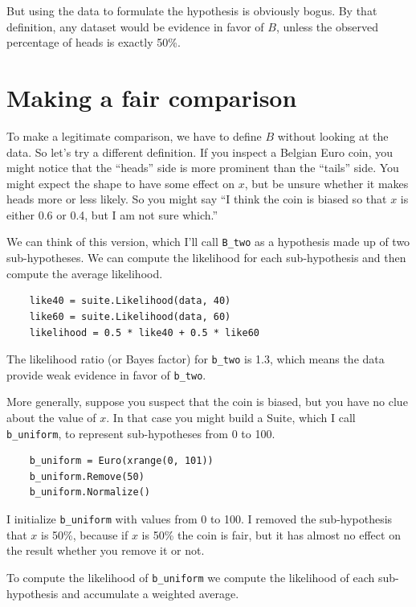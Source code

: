 \documentclass[12pt]{book}
\begin{document}
But using the data to formulate the hypothesis
is obviously bogus.  By that definition, any dataset would
be evidence in favor of $B$, unless the observed percentage of heads
is exactly 50\%.

\section{Making a fair comparison}
\label{suitelike}

To make a legitimate comparison, we have to define $B$ without looking
at the data.  So let's try a different definition.  If you inspect
a Belgian Euro coin, you might notice that the ``heads'' side is more
prominent than the ``tails'' side.  You might expect the shape to 
have some effect on
$x$, but be unsure whether it makes heads more or less
likely.  So you might say ``I think the coin is biased so that
$x$ is either 0.6 or 0.4, but I am not sure which.''

We can think of this version, which I'll call \verb"B_two"
as a hypothesis made up of two
sub-hypotheses.  We can compute the likelihood for each
sub-hypothesis and then compute the average likelihood.

\begin{verbatim}
    like40 = suite.Likelihood(data, 40)
    like60 = suite.Likelihood(data, 60)
    likelihood = 0.5 * like40 + 0.5 * like60
\end{verbatim}

The likelihood ratio (or Bayes factor) for \verb"b_two" is 1.3, which
means the data provide weak evidence in favor of \verb"b_two".

More generally, suppose you suspect that the coin is biased, but you
have no clue about the value of $x$.  In that case you might build a
Suite, which I call \verb"b_uniform", to represent sub-hypotheses from
0 to 100.

\begin{verbatim}
    b_uniform = Euro(xrange(0, 101))
    b_uniform.Remove(50)
    b_uniform.Normalize()
\end{verbatim}

I initialize \verb"b_uniform" with values from 0 to 100.
I removed the sub-hypothesis that $x$ is 50\%, because if
$x$ is 50\% the coin is fair, but it has almost no
effect on the result whether you remove it or not.

To compute the likelihood of
\verb"b_uniform" we compute the likelihood of each sub-hypothesis
and accumulate a weighted average.
\end{document}
